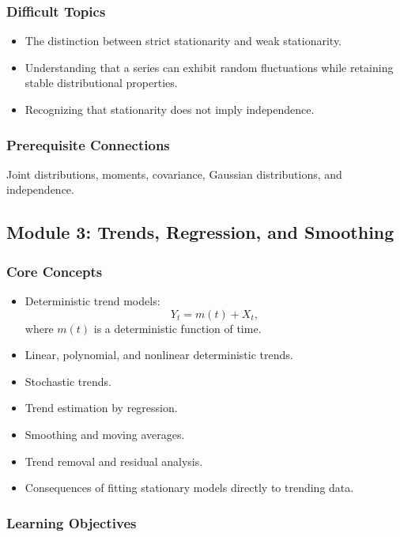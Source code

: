 \documentclass[11pt]{article}
\begin{document}
\subsubsection{Difficult Topics}

\begin{itemize}
    \item The distinction between strict stationarity and weak stationarity.
    \item Understanding that a series can exhibit random fluctuations while
    retaining stable distributional properties.
    \item Recognizing that stationarity does not imply independence.
\end{itemize}

\subsubsection{Prerequisite Connections}

Joint distributions, moments, covariance, Gaussian distributions, and
independence.

\subsection{Module 3: Trends, Regression, and Smoothing}

\subsubsection{Core Concepts}

\begin{itemize}
    \item Deterministic trend models:
    \[
    Y_t = m(t) + X_t,
    \]
    where \(m(t)\) is a deterministic function of time.
    \item Linear, polynomial, and nonlinear deterministic trends.
    \item Stochastic trends.
    \item Trend estimation by regression.
    \item Smoothing and moving averages.
    \item Trend removal and residual analysis.
    \item Consequences of fitting stationary models directly to trending data.
\end{itemize}

\subsubsection{Learning Objectives}
\end{document}
